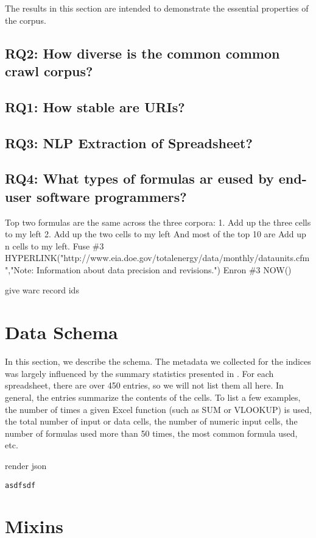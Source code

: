 \documentclass[conference]{IEEEtran}
\begin{document}
The results in this section are intended to demonstrate the essential properties of the corpus.

\subsection{RQ2: How diverse is the common common crawl corpus?}
\subsection{RQ1: How stable are URIs?}
\subsection{RQ3: NLP Extraction of Spreadsheet?}
\subsection{RQ4: What types of formulas ar eused by end-user software programmers?}


Top two formulas are the same across the three corpora: 
1. Add up the three cells to my left
2. Add up the two cells to my left
And most of the top 10 are Add up n cells to my left.
Fuse \#3 HYPERLINK("http://www.eia.doe.gov/totalenergy/data/monthly/dataunits.cfm","Note: Information about data precision and revisions.")
Enron \#3 NOW()  

give warc record ids


\section{Data Schema}
\label{sec:schema}
In this section, we describe the schema.
The metadata we collected for the indices was largely influenced by the summary statistics presented in \cite{Fisher2005}.  
For each spreadsheet, there are over 450 entries, so we will not list them all here.
In general, the entries summarize the contents of the cells.
To list a few examples, the number of times a given Excel function (such as SUM or VLOOKUP) is used, the total number of input or data cells, the number of numeric input cells, the number of formulas used more than 50 times, the most common formula used, etc.


render json

\begin{lstlisting}
asdfsdf
\end{lstlisting}

\section{Mixins}
\end{document}
